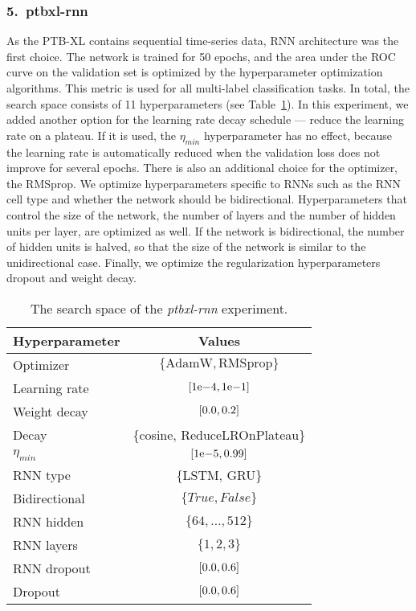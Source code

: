 \subsubsection{5.\ ptbxl-rnn}

As the PTB-XL contains sequential time-series data, RNN architecture was the first choice. The network is trained for 50 epochs, and the area under the ROC curve on the validation set is optimized by the hyperparameter optimization algorithms. This metric is used for all multi-label classification tasks. In total, the search space consists of 11 hyperparameters (see Table~\ref{tab:ptbxl_rnn}). In this experiment, we added another option for the learning rate decay schedule --- reduce the learning rate on a plateau. If it is used, the $\eta_{min}$ hyperparameter has no effect, because the learning rate is automatically reduced when the validation loss does not improve for several epochs. There is also an additional choice for the optimizer, the RMSprop. We optimize hyperparameters specific to RNNs such as the RNN cell type and whether the network should be bidirectional. Hyperparameters that control the size of the network, the number of layers and the number of hidden units per layer, are optimized as well. If the network is bidirectional, the number of hidden units is halved, so that the size of the network is similar to the unidirectional case. Finally, we optimize the regularization hyperparameters dropout and weight decay.

\begin{table}
    \centering
    \begin{tabular}{lc}
        \toprule
        Hyperparameter & Values \\
        \midrule
        Optimizer & $\{ \text{AdamW}, \text{RMSprop}\}$ \\
        Learning rate & $\interval{1\mathrm{e}{-4}}{1\mathrm{e}{-1}}$ \\
        Weight decay & $\interval{0.0}{0.2}$ \\
        Decay & \{cosine, ReduceLROnPlateau\} \\
        $\eta_{min}$ & $\interval{1\mathrm{e}{-5}}{0.99}$ \\
        RNN type & \{LSTM, GRU\} \\
        Bidirectional & $\{True, False\}$ \\
        RNN hidden & $\{64,\ldots , 512\}$ \\
        RNN layers & $\{1, 2, 3\}$ \\
        RNN dropout & $\interval{0.0}{0.6}$ \\
        Dropout & $\interval{0.0}{0.6}$ \\
        \bottomrule
    \end{tabular}
    \caption{The search space of the \textit{ptbxl-rnn} experiment.}
    \label{tab:ptbxl_rnn}
\end{table}

